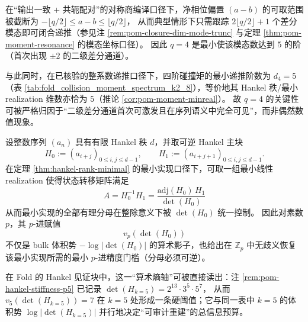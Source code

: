 
\begin{remark}[\texorpdfstring{$q=4$}{q=4} 的最小五模态开口：差分模态截断与 Hankel 秩首次对齐]\label{rem:pom-q4-minimal-five-mode-opening}
在“输出一致 + 共轭配对”的对称商编译口径下，净相位偏置 \((a-b)\) 的可取范围被截断为
\(-\lfloor q/2\rfloor\le a-b\le \lfloor q/2\rfloor\)，
从而典型情形下只需跟踪 \(2\lfloor q/2\rfloor+1\) 个差分模态即可闭合递推（参见注 \ref{rem:pom-closure-dim-mode-trunc} 与定理 \ref{thm:pom-moment-resonance} 的模态坐标口径）。
因此 \(q=4\) 是最小使该模态数达到 \(5\) 的阶（首次出现 \(\pm 2\) 的二级差分通道）。
\par
与此同时，在已核验的整系数递推口径下，四阶碰撞矩的最小递推阶数为 \(d_4=5\)（表 \ref{tab:fold_collision_moment_spectrum_k2_8}），等价地其 Hankel 秩/最小 realization 维数亦恰为 \(5\)（推论 \ref{cor:pom-moment-minreal}）。
故 \(q=4\) 的关键性可被严格归因于“二级差分通道首次可激发且在序列语义中完全可见”，而非偶然数值现象。
\end{remark}

\begin{remark}\label{rem:pom-hankel-arithmetic-entropy-barrier}
设整数序列 \((a_n)\) 具有有限 Hankel 秩 \(d\)，并取可逆 Hankel 主块
\[
H_0:=(a_{i+j})_{0\le i,j\le d-1},
\qquad
H_1:=(a_{i+j+1})_{0\le i,j\le d-1}.
\]
在定理 \ref{thm:hankel-rank-minimal} 的最小实现口径下，可取一组最小线性 realization 使得状态转移矩阵满足
\[
\boxed{\;
A=H_0^{-1}H_1=\frac{\mathrm{adj}(H_0)\,H_1}{\det(H_0)}\;}
\]
从而最小实现的全部有理分母在整除意义下被 \(\det(H_0)\) 统一控制。
因此对素数 \(p\)，其 \(p\)-进赋值
\[
v_p(\det(H_0))
\]
不仅是 bulk 体积势 \(-\log|\det(H_0)|\) 的算术影子，也给出在 \(\mathbb{Z}_p\) 中无歧义恢复该最小实现所需的最小 \(p\)-进精度门槛（分母必须可逆）。
\par
在 Fold 的 Hankel 见证块中，这一“算术熵轴”可被直接读出：注 \ref{rem:pom-hankel-stiffness-p5} 已记录
\(
\det(H_{k=5})=2^{13}\cdot 3^5\cdot 5^7
\)，
从而 \(v_5(\det(H_{k=5}))=7\) 在 \(k=5\) 处形成一条硬阈值；它与同一表中 \(k=5\) 的体积势 \(\log|\det(H_{k=5})|\) 并行地决定“可审计重建”的总信息预算。
\end{remark}

